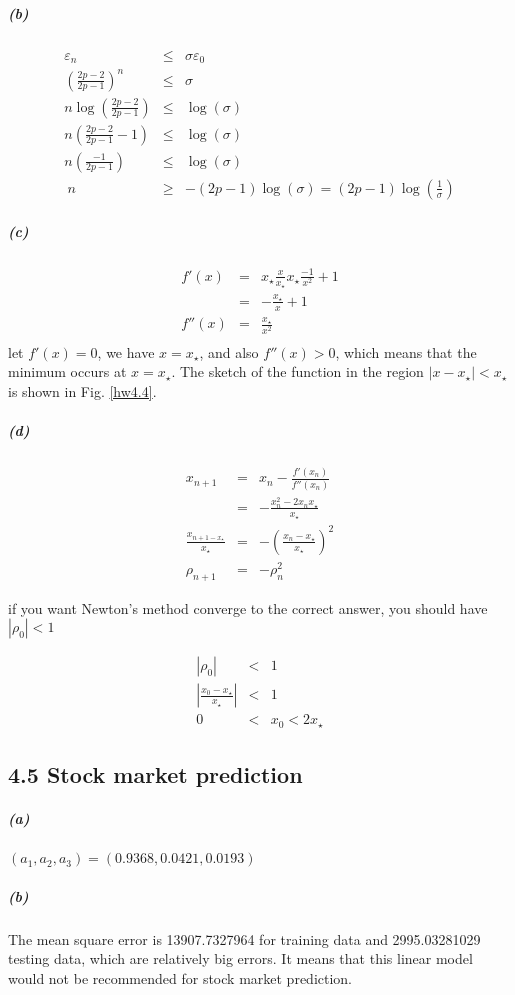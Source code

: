 \documentclass{article}
\begin{document}
\subparagraph*{(b)}
\begin{eqnarray*}
	\varepsilon_n &\le& \sigma \varepsilon_0\\
	\left(\frac{2p-2}{2p-1}\right)^n &\le& \sigma\\
	n\log\left(\frac{2p-2}{2p-1}\right) &\le& \log(\sigma)\\
	n(\frac{2p-2}{2p-1}-1) &\le& \log(\sigma)\\
	n(\frac{-1}{2p-1}) &\le& \log(\sigma)\\\
	n &\ge& -(2p-1)\log(\sigma) = (2p-1)\log(\frac{1}{\sigma})
\end{eqnarray*}

\subparagraph*{(c)}
\begin{eqnarray*}
	f'(x) &=& x_{\star} \frac{x}{x_{\star}} x_{\star} \frac{-1}{x^2} + 1\\
	&=& -\frac{x_{\star}}{x} + 1\\
	f''(x) &=& \frac{x_{\star}}{x^2}\\
\end{eqnarray*}
let $f'(x)=0$, we have $x = x_{\star}$, and also $f''(x)>0$, which means that the minimum occurs at $x = x_{\star}$. The sketch of the function in the region $|x-x_{\star}|<x_{\star}$ is shown in Fig. \ref{hw4.4}.


\subparagraph*{(d)}
\begin{eqnarray*}
	x_{n+1}&=& x_{n} - \frac{f'(x_n)}{f''(x_n)}\\
	&=&  - \frac{x_n^2-2x_n x_{\star}}{x_{\star}}\\
	\frac{x_{n+1-x_{\star}}}{x_{\star}} &=& - \left(\frac{x_n - x_{\star}}{x_{\star}}\right)^2\\
	\rho_{n+1} &=& -\rho_n^2
\end{eqnarray*}

if you want Newton’s method converge to the correct answer, you should have $|\rho_0| < 1$

\begin{eqnarray*}
	|\rho_0| &<& 1\\
	|\frac{x_0 - x_{\star}}{x_{\star}}| &<& 1\\
	0 &<& x_0 < 2x_{\star}
\end{eqnarray*}

\subsection*{4.5 Stock market prediction}
\subparagraph*{(a)}
$(a_1,a_2,a_3) = (0.9368, 0.0421, 0.0193)$
\subparagraph*{(b)}
The mean square error is 13907.7327964 for training data and 2995.03281029 testing data, which are relatively big errors. It means that this linear model would not be recommended for stock market prediction.
\end{document}
